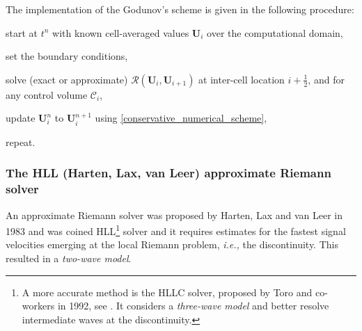 \documentclass[a4paper]{article}
\numberwithin{equation}{section}
\newcommand{\ie}{\textit{i.e.,} }
\begin{document}
	The implementation of the Godunov's scheme is given in the following procedure:
	\begin{compactitem}
		\item start at $t^n$ with known cell-averaged values $\mathbf{U}_i$ over the computational domain,
		\item set the boundary conditions,
		\item solve (exact or approximate) $\mathcal{R}(\mathbf{U}_{i},\mathbf{U}_{i+1})$ at inter-cell location $i+\frac{1}{2}$, and for any control volume $\mathcal{C}_i$,
		\item update $\mathbf{U}_i^n$ to $\mathbf{U}_i^{n+1}$ using \ref{conservative_numerical_scheme},
		\item repeat.
	\end{compactitem}
	
	\subsubsection{The HLL (Harten, Lax, van Leer) approximate Riemann solver}
	An approximate Riemann solver was proposed by Harten, Lax and van Leer in 1983 and was coined HLL\footnote{A more accurate method is the HLLC solver, proposed by Toro and co-workers in 1992, see \cite{toro2001,toro2019}. It considers a \textit{three-wave model} and better resolve intermediate waves at the discontinuity.} solver \parencite{harten1983} and it requires estimates for the fastest signal velocities emerging at the local Riemann problem, \ie the discontinuity. This resulted in a \textit{two-wave model}. 
	
\end{document}
